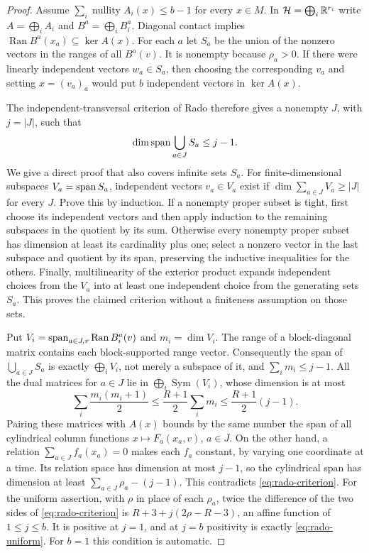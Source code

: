 \begin{proof}
Assume $\sum_i\operatorname{nullity}A_i(x)\leq b-1$ for every $x\in M$.
In
$\mathcal H=\bigoplus_i\mathbb R^{r_i}$ write $A=\bigoplus_iA_i$ and
$B^a=\bigoplus_iB_i^a$. Diagonal contact implies
$\operatorname{Ran}B^a(x_a)\subseteq\ker A(x)$. For each $a$ let
$S_a$ be the union of the nonzero vectors in the ranges of all $B^a(v)$.
It is nonempty because $\rho_a>0$. If there were linearly independent
vectors $w_a\in S_a$, then choosing the corresponding $v_a$ and setting
$x=(v_a)_a$ would put $b$ independent vectors in $\ker A(x)$.

The independent-transversal criterion of Rado \citep{Rado1942} therefore
gives a nonempty $J$, with $j=|J|$, such that
\[
 \dim\operatorname{span}\bigcup_{a\in J}S_a\leq j-1.
\]
We give a direct proof that also covers infinite sets $S_a$. For
finite-dimensional subspaces $V_a=\operatorname{span} S_a$, independent vectors
$v_a\in V_a$ exist if $\dim\sum_{a\in J}V_a\geq|J|$ for every $J$.
Prove this by induction. If a nonempty proper subset is tight, first
choose its independent vectors and then apply induction to the remaining
subspaces in the quotient by its sum. Otherwise every nonempty proper
subset has dimension at least its cardinality plus one; select a nonzero
vector in the last subspace and quotient by its span, preserving the
inductive inequalities for the others. Finally, multilinearity of the
exterior product expands independent choices from the $V_a$ into at least
one independent choice from the generating sets $S_a$. This proves the
claimed criterion without a finiteness assumption on those sets.

Put $V_i=\operatorname{span}_{a\in J,v}\operatorname{Ran}B_i^a(v)$ and
$m_i=\dim V_i$. The range of a block-diagonal matrix contains each
block-supported range vector. Consequently the span of $\bigcup_{a\in J}S_a$ is exactly
$\bigoplus_i V_i$, not merely a subspace of it, and
$\sum_i m_i\leq j-1$. All the dual matrices for $a\in J$ lie in
$\bigoplus_i\operatorname{Sym}(V_i)$, whose dimension is at most
\[
 \sum_i\frac{m_i(m_i+1)}2
       \leq\frac{R+1}2\sum_i m_i
       \leq\frac{R+1}2(j-1).
\]
Pairing these matrices with $A(x)$ bounds by the same number the span of
all cylindrical column functions $x\mapsto F_a(x_a,v)$, $a\in J$.
On the other hand, a relation $\sum_{a\in J}f_a(x_a)=0$ makes each
$f_a$ constant, by varying one coordinate at a time. Its relation space
has dimension at most $j-1$, so the cylindrical span has dimension at
least $\sum_{a\in J}\rho_a-(j-1)$. This contradicts
\eqref{eq:rado-criterion}.
For the uniform assertion, with $\rho$ in place of each $\rho_a$,
twice the difference of the two sides of \eqref{eq:rado-criterion} is
$R+3+j(2\rho-R-3)$, an affine function of $1\leq j\leq b$.
It is positive at $j=1$, and at $j=b$ positivity is exactly
\eqref{eq:rado-uniform}. For $b=1$ this condition is automatic.
\end{proof}

